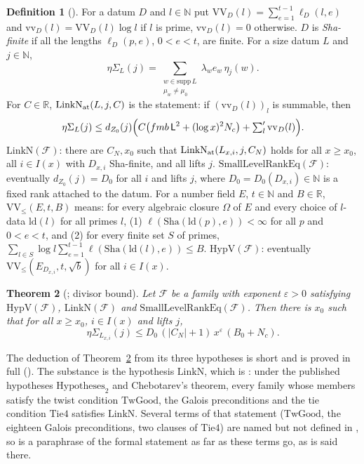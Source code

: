 \documentclass[10pt]{amsart}
\newtheorem{theorem}{Theorem}[section]
\theoremstyle{definition}
\newtheorem{definition}[theorem]{Definition}
\theoremstyle{remark}
\newcommand{\R}{\mathbb R}
\newcommand{\N}{\mathbb N}
\begin{document}
\begin{definition}[{\cite[Definitions~\ref{A-i2:def-vv}, \ref{A-i2:def-LinkN}, \ref{A-i2:def-HypV}]{Annex}}]\label{inp:def-div}
For a datum $D$ and $l\in\N$ put $\mathrm{VV}_D(l)=\sum_{e=1}^{t-1}\ell_D(l,e)$ and
$\mathrm{vv}_D(l)=\mathrm{VV}_D(l)\log l$ if $l$ is prime, $\mathrm{vv}_D(l)=0$ otherwise.
$D$ is \emph{Sha-finite} if all the lengths $\ell_D(p,e)$, $0<e<t$, are
finite. For a size datum $L$ and $j\in\N$,
\[
\eta\Sigma_L(j)=\sum_{\substack{w\in\mathrm{supp}\,L\\ \mu_w\ne\mu_0}}\lambda_we_w\,\eta_j(w).
\]
For $C\in\R$, $\mathrm{LinkN}_{\rm at}(L,j,C)$ is the
statement: if $(\mathrm{vv}_D(l))_l$ is summable, then
\[
\eta\Sigma_L(j)\le d_{Z_0}(j)\Bigl(C\bigl(fmb\,\mathsf L^2+(\log x)^2N_c\bigr)+\textstyle\sum'_l\mathrm{vv}_D(l)\Bigr).
\]
$\mathrm{LinkN}(\mathcal F)$: there are $C_N,x_0$ such that $\mathrm{LinkN}_{\rm at}(L_{x,i},j,C_N)$
holds for all $x\ge x_0$, all $i\in I(x)$ with $D_{x,i}$ Sha-finite, and all lifts $j$.
$\mathrm{SmallLevelRankEq}(\mathcal F)$: eventually $d_{Z_0}(j)=D_0$ for all $i$ and lifts $j$,
where $D_0=D_0(D_{x,i})\in\N$ is a fixed rank attached to the datum.
For a number field $E$, $t\in\N$ and $B\in\R$, $\mathrm{VV}_\le(E,t,B)$ means: for every
algebraic closure $\Omega$ of $E$ and every choice of $l$-data $\mathrm{ld}(l)$ for all primes
$l$, (1) $\ell(\mathrm{Sha}(\mathrm{ld}(p),e))<\infty$ for all $p$ and $0<e<t$, and (2) for every
finite set $S$ of primes,
$\sum_{l\in S}\log l\sum_{e=1}^{t-1}\ell(\mathrm{Sha}(\mathrm{ld}(l),e))\le B$.
$\mathrm{HypV}(\mathcal F)$: eventually $\mathrm{VV}_\le(E_{D_{x,i}},t,\sqrt{b})$ for all $i\in I(x)$.
\end{definition}

\begin{theorem}[{\cite[Theorem~\ref{A-i2:thm-div}]{Annex}}; divisor bound]\label{inp:thm-div}
Let $\mathcal F$ be a family with exponent $\varepsilon>0$ satisfying
$\mathrm{HypV}(\mathcal F)$, $\mathrm{LinkN}(\mathcal F)$ and
$\mathrm{SmallLevelRankEq}(\mathcal F)$. Then there is $x_0$ such that for all
$x\ge x_0$, $i\in I(x)$ and lifts $j$,
\[
 \eta\Sigma_{L_{x,i}}(j)\le D_0\,(|C_N|+1)\,x^{\varepsilon}\,(B_0+N_c).
\]
\end{theorem}

The deduction of Theorem~\ref{inp:thm-div} from its three hypotheses is
short and is proved in full (\cite[\S\ref{A-i2:ssec-red}]{Annex}). The
substance is the hypothesis $\mathrm{LinkN}$, which is
\cite[Theorem~\ref{A-i2:thm-linkN}]{Annex}: under the published hypotheses
$\mathrm{Hypotheses}_2$ and Chebotarev's theorem, every family whose
members satisfy the twist condition $\mathrm{TwGood}$, the Galois
preconditions and the tie condition $\mathrm{Tie4}$ satisfies
$\mathrm{LinkN}$. Several terms of that statement ($\mathrm{TwGood}$, the
eighteen Galois preconditions, two clauses of $\mathrm{Tie4}$) are named
but not defined in \cite{Annex}, so \cite[Theorem~\ref{A-i2:thm-linkN}]{Annex}
is a paraphrase of the formal statement as far as these terms go, as is
said there.
\end{document}

